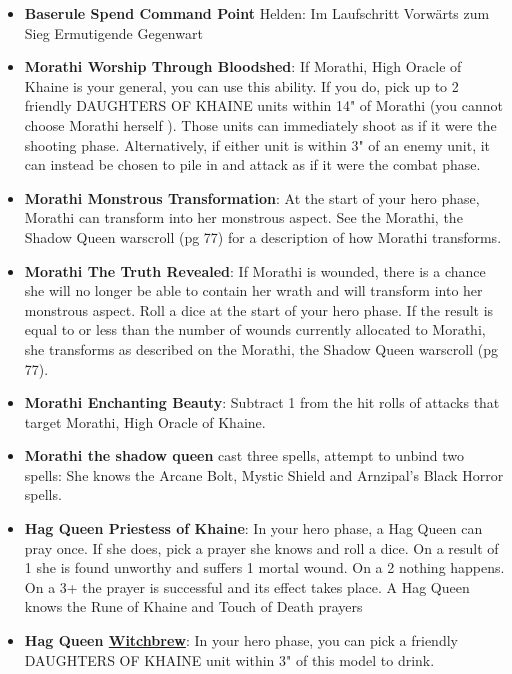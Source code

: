 \begin{itemize}
\item
  \textbf{Baserule \textbar{} Spend Command Point} Helden: Im
  Laufschritt \textbar{} Vorwärts zum Sieg \textbar{} Ermutigende
  Gegenwart
\item
  \textbf{Morathi \textbar{} Worship Through Bloodshed}: If Morathi,
  High Oracle of Khaine is your general, you can use this ability. If
  you do, pick up to 2 friendly DAUGHTERS OF KHAINE units within 14" of
  Morathi (you cannot choose Morathi herself ). Those units can
  immediately shoot as if it were the shooting phase. Alternatively, if
  either unit is within 3" of an enemy unit, it can instead be chosen to
  pile in and attack as if it were the combat phase.
\item
  \textbf{Morathi \textbar{} Monstrous Transformation}: At the start of
  your hero phase, Morathi can transform into her monstrous aspect. See
  the Morathi, the Shadow Queen warscroll (pg 77) for a description of
  how Morathi transforms.
\item
  \textbf{Morathi \textbar{} The Truth Revealed}: If Morathi is wounded,
  there is a chance she will no longer be able to contain her wrath and
  will transform into her monstrous aspect. Roll a dice at the start of
  your hero phase. If the result is equal to or less than the number of
  wounds currently allocated to Morathi, she transforms as described on
  the Morathi, the Shadow Queen warscroll (pg 77).
\item
  \textbf{Morathi \textbar{} Enchanting Beauty}: Subtract 1 from the hit
  rolls of attacks that target Morathi, High Oracle of Khaine.
\item
  \textbf{Morathi the shadow queen} cast three spells, attempt to unbind
  two spells: She knows the Arcane Bolt, Mystic Shield and Arnzipal's
  Black Horror spells.
\item
  \textbf{Hag Queen \textbar{} Priestess of Khaine}: In your hero phase,
  a Hag Queen can pray once. If she does, pick a prayer she knows and
  roll a dice. On a result of 1 she is found unworthy and suffers 1
  mortal wound. On a 2 nothing happens. On a 3+ the prayer is successful
  and its effect takes place. A Hag Queen knows the Rune of Khaine and
  Touch of Death prayers
\item
  \textbf{Hag Queen \textbar{}
  \protect\hyperlink{Withchbrew}{Witchbrew}}: In your hero phase, you
  can pick a friendly DAUGHTERS OF KHAINE unit within 3" of this model
  to drink.
\end{itemize}

